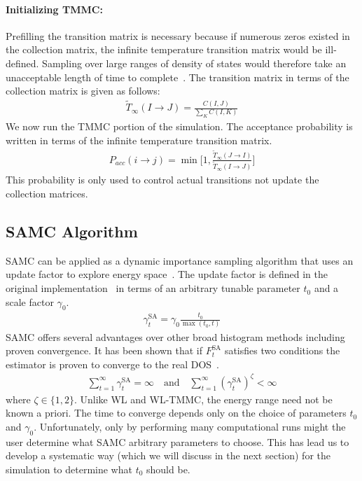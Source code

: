 \documentclass[letterpaper,twocolumn,amsmath,amssymb,pre,aps,10pt]{revtex4-1}
\begin{document}
\paragraph{Initializing TMMC:} Prefilling the transition
matrix is necessary because if numerous zeros existed in the collection
matrix, the infinite temperature transition matrix would be
ill-defined.  Sampling over large ranges of density of states would
therefore take an unacceptable length of time to
complete~\cite{shell2003improved, shen2014elucidating}.  The transition
matrix in terms of the collection matrix is given as
follows:
\begin{align}
\widetilde{T}_{\infty}(I\rightarrow J) = \frac{C(I,J)}
{\sum_{K} C(I,K)}
\end{align}
We now run the TMMC portion of the simulation.
The acceptance probability is written in terms of the infinite temperature
transition matrix.
\begin{align}
  P_{acc}(i\rightarrow j) = \min\bigg[1,\frac{\widetilde{T}_{\infty}(J\rightarrow I)}
  {\widetilde{T}_{\infty}(I\rightarrow J)}\bigg]
\end{align}
This probability is only used to control actual transitions not update
the collection matrices.

\subsection{SAMC Algorithm}
SAMC can be applied as a dynamic importance sampling algorithm that
uses an update factor to explore energy
space~\cite{liang2007stochastic, werlich2015stochastic,
schneider2017convergence}.  The update factor is defined in the
original implementation~\cite{liang2007stochastic} in terms of an
arbitrary tunable parameter $t_0$ and a scale factor $\gamma_0$.
\begin{align}
\gamma_{t}^{\text{SA}} =\gamma_0 \frac{t_0}{\max(t_0,t)}
\end{align}
SAMC offers several advantages over other broad histogram methods
including proven convergence. It has been shown that if
$F_{t}^{\text{SA}}$ satisfies two conditions the estimator is proven to
converge to the real DOS~\cite{liang2006theory, liang2007stochastic}.
\begin{align}
\sum_{t=1}^\infty \gamma_{t}^{\text{SA}} = \infty \quad\textrm{and}\quad
\sum_{t=1}^\infty (\gamma_{t}^{\text{SA}})^\zeta < \infty
\end{align}
where $\zeta \in \{1,2\}$.  Unlike WL and WL-TMMC, the energy range need
not be known a priori.  The time to converge depends only on the choice of
parameters $t_0$ and $\gamma_0$.
Unfortunately, only by performing many computational runs might the user
determine what SAMC arbitrary parameters to choose.  This has lead us
to develop a systematic way (which we will discuss in the next section)
for the simulation to determine what $t_0$ should be.
\end{document}
